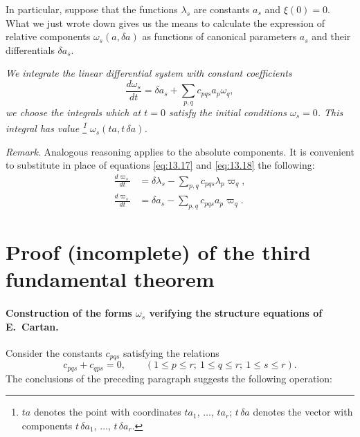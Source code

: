 \documentclass[leqno,11pt]{book}
\numberwithin{equation}{chapter}
\theoremstyle{shape1}
\theoremstyle{shapesmall}
\newcommand{\vp}{\varpi}
\newcommand{\somespace}{\vspace{9pt}}
\begin{document}
In particular, suppose that the functions $\lambda_{s}$ are constants $a_{s}$ and $\xi(0)=0$. What we just wrote down gives us the means to calculate the expression of relative components $\omega_{s}(a,\delta a)$ as functions of canonical parameters $a_{s}$ and their differentials $\delta a_{s}$.

\somespace

\emph{We integrate the linear differential system with constant coefficients}
\begin{equation}
  \label{eq:13.18}
  \frac{d\omega_{s}}{dt}=\delta a_{s}+\sum_{p,q}c_{pqs}a_{p}\omega_{q},
\end{equation}
\emph{we choose the integrals which at $t=0$ satisfy the initial conditions $\omega_{s}=0$. This integral has value \footnote{$ta$ denotes the point with coordinates $ta_{1}$, $\dots$, $ta_{r}$; $t\,\delta a$ denotes the vector with components $t\,\delta a_{1}$, $\dots$, $t\,\delta a_{r}$.} $\omega_{s}(ta,t\,\delta a)$.}

\somespace

\emph{Remark}. Analogous reasoning applies to the absolute components. It is convenient to substitute in place of equations \eqref{eq:13.17} and \eqref{eq:13.18} the following:
\begin{align}
  \label{eq:13.19}
  \frac{d\vp_{s}}{dt}&=\delta \lambda_{s}-\sum_{p,q}c_{pqs}\lambda_{p}\vp_{q},\\
  \label{eq:13.20}
  \frac{d\vp_{s}}{dt}&=\delta a_{s}-\sum_{p,q}c_{pqs}a_{p}\vp_{q}.
\end{align}


\section{Proof (incomplete) of the third fundamental theorem}
\label{sec:proof-incompl-third}

\paragraph{Construction of the forms $\omega_{s}$ verifying the structure equations of E.~Cartan.}
\label{sec:203}
Consider the constants $c_{pqs}$ satisfying the relations
\begin{equation}
  \label{eq:13.21}
  c_{pqs}+c_{qps}=0,\qquad(1\le p\le r;\ 1\le q\le r;\ 1\le s\le r).
\end{equation}
The conclusions of the preceding paragraph suggests the following operation:

\somespace
\end{document}
